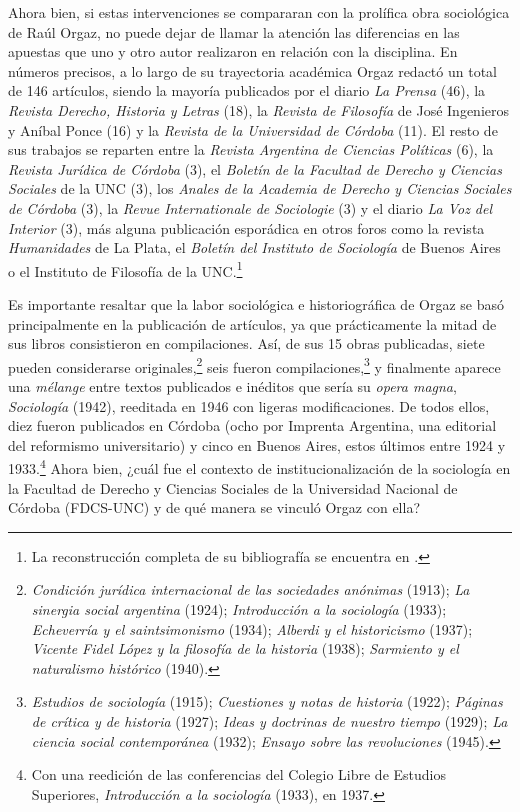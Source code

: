 Ahora bien, si estas intervenciones se compararan con la prolífica obra sociológica de Raúl Orgaz, no puede dejar de llamar la atención las diferencias en las apuestas que uno y otro autor realizaron en relación con la disciplina. En números precisos, a lo largo de su trayectoria académica Orgaz redactó un total de 146 artículos, siendo la mayoría publicados por el diario \emph{La Prensa} (46), la \emph{Revista Derecho, Historia y Letras} (18), la \emph{Revista de Filosofía} de José Ingenieros y Aníbal Ponce (16) y la \emph{Revista de la Universidad de Córdoba} (11). El resto de sus trabajos se reparten entre la \emph{Revista Argentina de Ciencias Políticas} (6), la \emph{Revista Jurídica de Córdoba} (3), el \emph{Boletín de la Facultad de Derecho y Ciencias Sociales} de la UNC (3), los \emph{Anales de la Academia de Derecho y Ciencias Sociales de Córdoba} (3), la \emph{Revue Internationale de Sociologie} (3) y el diario \emph{La Voz del Interior} (3), más alguna publicación esporádica en otros foros como la revista \emph{Humanidades} de La Plata, el \emph{Boletín del Instituto de Sociología} de Buenos Aires o el Instituto de Filosofía de la UNC.\footnote{La reconstrucción completa de su bibliografía se encuentra en \textcite{1544-ORGAZ1960}.}

Es importante resaltar que la labor sociológica e historiográfica de Orgaz se basó principalmente en la publicación de artículos, ya que prácticamente la mitad de sus libros consistieron en compilaciones. Así, de sus 15 obras publicadas, siete pueden considerarse originales,\footnote{\emph{Condición jurídica internacional de las sociedades anónimas} (1913); \emph{La sinergia social argentina} (1924); \emph{Introducción a la sociología} (1933); \emph{Echeverría y el saintsimonismo} (1934); \emph{Alberdi y el historicismo} (1937); \emph{Vicente Fidel López y la filosofía de la historia} (1938); \emph{Sarmiento y el naturalismo histórico} (1940).} seis fueron compilaciones,\footnote{\emph{Estudios de sociología} (1915); \emph{Cuestiones y notas de historia} (1922); \emph{Páginas de crítica y de historia} (1927); \emph{Ideas y doctrinas de nuestro tiempo} (1929); \emph{La ciencia social contemporánea} (1932); \emph{Ensayo sobre las revoluciones} (1945).} y finalmente aparece una \emph{mélange} entre textos publicados e inéditos que sería su \emph{opera magna}, \emph{Sociología} (1942), reeditada en 1946 con ligeras modificaciones. De todos ellos, diez fueron publicados en Córdoba (ocho por Imprenta Argentina, una editorial del reformismo universitario) y cinco en Buenos Aires, estos últimos entre 1924 y 1933.\footnote{Con una reedición de las conferencias del Colegio Libre de Estudios Superiores, \emph{Introducción a la sociología} (1933), en 1937.} Ahora bien, ¿cuál fue el contexto de institucionalización de la sociología en la Facultad de Derecho y Ciencias Sociales de la Universidad Nacional de Córdoba (FDCS-UNC) y de qué manera se vinculó Orgaz con ella?

